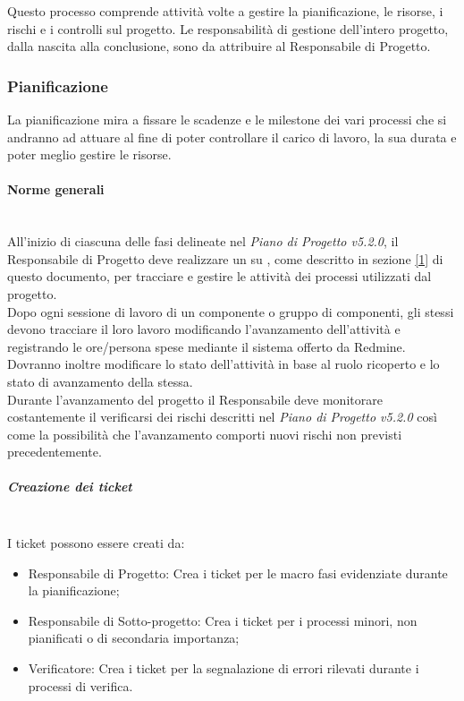 Questo processo comprende attivit\`{a} volte a gestire la pianificazione, le risorse, i rischi e i controlli sul progetto.
Le responsabilità di gestione dell’intero progetto, dalla nascita alla conclusione, sono da attribuire al Responsabile di Progetto.

\subsubsection{Pianificazione}
La pianificazione mira a fissare le scadenze e le milestone dei vari processi che si andranno ad attuare al fine di poter controllare il carico di lavoro, la sua durata e poter meglio gestire le risorse.

\paragraph{Norme generali} \hfill \\
All'inizio di ciascuna delle fasi delineate nel \emph{Piano di Progetto v5.2.0}, il Responsabile di Progetto deve realizzare un  su , come descritto in sezione \ref{1} di questo documento, per tracciare e gestire le attivit\`{a} dei processi utilizzati dal progetto.\\
Dopo ogni sessione di lavoro di un componente o gruppo di componenti, gli stessi devono tracciare il loro lavoro modificando l'avanzamento dell'attivit\`{a} e registrando le ore/persona spese mediante il sistema offerto da Redmine.
Dovranno inoltre modificare lo stato dell'attivit\`{a} in base al ruolo ricoperto e lo stato di avanzamento della stessa.\\
Durante l'avanzamento del progetto il Responsabile  deve monitorare costantemente il verificarsi dei rischi descritti nel \emph{Piano di Progetto v5.2.0} così come la possibilità che l'avanzamento comporti nuovi rischi non previsti precedentemente.

\subparagraph{Creazione dei ticket} \hfill \\
I ticket possono essere creati da:
\begin{itemize}
\item Responsabile di Progetto: Crea i ticket per le macro fasi evidenziate durante la pianificazione;
\item Responsabile di Sotto-progetto: Crea i ticket per i processi minori, non pianificati o di secondaria importanza;
\item Verificatore: Crea i ticket per la segnalazione di errori rilevati durante i processi di verifica.
\end{itemize}

